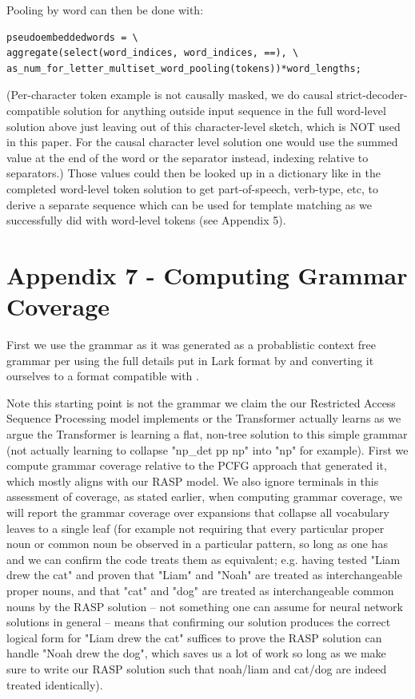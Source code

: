 \documentclass[11pt]{article}
\begin{document}
Pooling by word can then be done with:
\begin{tiny}
\begin{verbatim}
pseudoembeddedwords = \
aggregate(select(word_indices, word_indices, ==), \
as_num_for_letter_multiset_word_pooling(tokens))*word_lengths;
\end{verbatim}
\end{tiny}
(Per-character token example is not causally masked, we do causal strict-decoder-compatible solution for anything outside input sequence in the full word-level solution above just leaving out of this character-level sketch, which is NOT used in this paper. For the causal character level solution one would use the summed value at the end of the word or the separator instead, indexing relative to separators.) 
\clearpage
Those values could then be looked up in a dictionary like in the completed word-level token solution to get part-of-speech, verb-type, etc, to derive a separate sequence which can be used for template matching as we successfully did with word-level tokens (see Appendix 5).

\section{Appendix 7 - Computing Grammar Coverage}

First we use the grammar as it was generated as a probablistic context free grammar per \cite{KimLinzen2020}
using the full details put in Lark format by \cite{klinger2024compositionalprogramgenerationfewshot}
and converting it ourselves to a format compatible with \cite{fuzzingbook2023:GrammarCoverageFuzzer}.

Note this starting point is not the grammar we claim the our Restricted Access Sequence Processing model implements or the Transformer actually learns as we argue the Transformer is learning a flat, non-tree solution to this simple grammar (not actually learning to collapse "np\_det pp np" into "np" for example). First we compute grammar coverage relative to the PCFG approach that generated it, which mostly aligns with our RASP model. We also ignore terminals in this assessment of coverage, as stated earlier, when computing grammar coverage, we will report the grammar coverage over expansions that collapse all vocabulary leaves to a single leaf (for example not requiring that every particular proper noun or common noun be observed in a particular pattern, so long as one has and we can confirm the code treats them as equivalent; e.g. having tested "Liam drew the cat" and proven that "Liam" and "Noah" are treated as interchangeable proper nouns, and that "cat" and "dog" are treated as interchangeable common nouns by the RASP solution -- not something one can assume for neural network solutions in general -- means that confirming our solution produces the correct logical form for "Liam drew the cat" suffices to prove the RASP solution can handle "Noah drew the dog", which saves us a lot of work so long as we make sure to write our RASP solution such that noah/liam and cat/dog are indeed treated identically).
\end{document}
